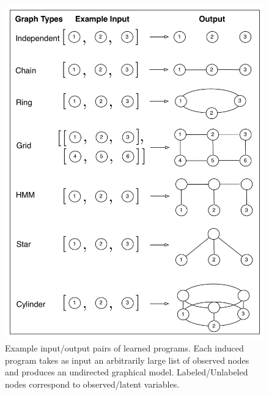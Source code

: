 \documentclass{article} %
\begin{document}
\begin{figure}[h]
\begin{minipage}[t]{.4\textwidth}

  \includegraphics[width=\linewidth]{./figures/tasks.pdf}
  \caption{Example input/output pairs of learned programs. Each induced program takes as input an arbitrarily large list of observed nodes and produces an undirected graphical model. Labeled/Unlabeled nodes correspond to observed/latent variables.}
  \label{fig:tasks}
\end{minipage}
\hspace{0.2in}
\begin{minipage}[t]{.5\textwidth}

\end{minipage}
\end{figure}
\end{document}
